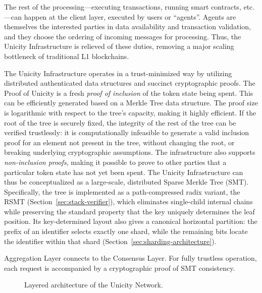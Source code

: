 \documentclass[11pt]{article}
\begin{document}
The rest of the processing---executing transactions, running smart contracts, etc.---can happen at the client layer, executed by users or ``agents''. Agents are themselves the interested parties in data availability and transaction validation, and they choose the ordering of incoming messages for processing. Thus, the Unicity Infrastructure is relieved of these duties, removing a major scaling bottleneck of traditional L1 blockchains.

The Unicity Infrastructure operates in a trust-minimized way by utilizing distributed authenticated data structures and succinct cryptographic proofs. The Proof of Unicity is a fresh \emph{proof of inclusion} of the token state being spent. This can be efficiently generated based on a Merkle Tree data structure. The proof size is logarithmic with respect to the tree's capacity, making it highly efficient. If the root of the tree is securely fixed, the integrity of the rest of the tree can be verified trustlessly: it is computationally infeasible to generate a valid inclusion proof for an element not present in the tree, without changing the root, or breaking underlying cryptographic assumptions. The infrastructure also supports \textit{non-inclusion proofs}, making it possible to prove to other parties that a particular token state has not yet been spent. The Unicity Infrastructure can thus be conceptualized as a large-scale, distributed Sparse Merkle Tree (SMT). Specifically, the tree is implemented as a path-compressed radix variant, the RSMT (Section~\ref{sec:stack-verifier}), which eliminates single-child internal chains while preserving the standard property that the key uniquely determines the leaf position. Its key-determined layout also gives a canonical horizontal partition: the prefix of an identifier selects exactly one shard, while the remaining bits locate the identifier within that shard (Section~\ref{sec:sharding-architecture}).

Aggregation Layer connects to the Consensus Layer. For fully trustless operation, each request is accompanied by a cryptographic proof of SMT consistency.

\begin{figure}[!htbp]
    \centering
    \caption{Layered architecture of the Unicity Network.}\label{fig:layers}
\end{figure}
\end{document}

